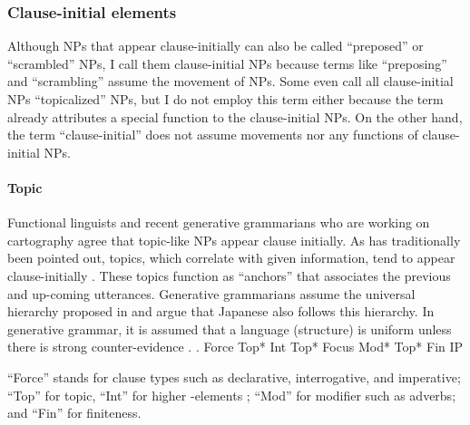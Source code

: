 
\subsubsection{Clause-initial elements}

Although NPs that appear clause-initially can also be called
``preposed'' or ``scrambled'' NPs,
I call them clause-initial NPs
because terms like ``preposing'' and ``scrambling'' assume
the movement of NPs.
Some even call all clause-initial NPs ``topicalized'' NPs,
but I do not employ this term either because
the term already attributes a special function to the clause-initial NPs.
On the other hand, the term ``clause-initial'' does not assume movements
nor any functions of clause-initial NPs.

\paragraph{Topic}

Functional linguists and recent generative grammarians who are working on cartography agree that topic-like NPs appear clause initially.
As has traditionally been pointed out,
topics, which correlate with given information,
tend to appear clause-initially
\cite{mathesius28,firbas64,danes70,kuno78}.
These topics function as ``anchors''
that associates the previous and up-coming utterances.
Generative grammarians \cite[e.g.,][]{endo14} assume the universal hierarchy \Next proposed in 
and argue that Japanese also follows this hierarchy.
In generative grammar,
it is assumed that a language (structure) is uniform
unless there is strong counter-evidence
\cite[the Uniformity Principle:][2]{chomsky01}.
%
 \ex. Force Top* Int Top* Focus Mod* Top* Fin IP
    \hfill{\cite[242]{rizzi04}}

``Force'' stands for clause types such as declarative, interrogative, and imperative;
``Top'' for topic,
``Int'' for higher -elements \cite{rizzi01};
``Mod'' for modifier such as adverbs; and
``Fin'' for finiteness.


